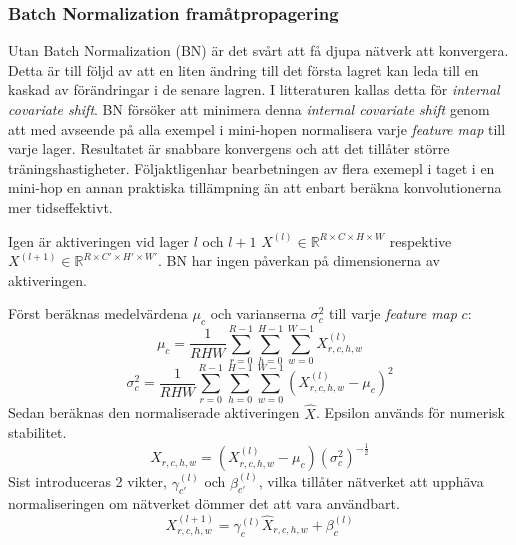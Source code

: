 \documentclass[a4paper,11pt,twoside]{article}
\begin{document}
\subsubsection{Batch Normalization framåtpropagering}
Utan Batch Normalization (BN) är det svårt att få djupa nätverk att konvergera. Detta är till följd av att en liten ändring till det första lagret kan leda till en kaskad av förändringar i de senare lagren. I litteraturen kallas detta för \textit{internal covariate shift}. BN försöker att minimera denna \textit{internal covariate shift} genom att med avseende på alla exempel i mini-hopen normalisera varje \textit{feature map} till varje lager. Resultatet är snabbare konvergens och att det tillåter större träningshastigheter. Följaktligenhar bearbetningen av flera exemepl i taget i en mini-hop en annan praktiska tillämpning än att enbart beräkna konvolutionerna mer tidseffektivt. \cite{cs231n} \cite{batchnorm}

Igen är aktiveringen vid lager $l$ och $l+1$ $X^{(l)} \in \mathbb{R}^{R \times C \times H \times W}$ respektive $X^{(l+1)} \in \mathbb{R}^{R \times C' \times H' \times W'}$. BN har ingen påverkan på dimensionerna av aktiveringen. \cite{cs231n} \cite{batchnorm}

Först beräknas medelvärdena $\mu_c$ och varianserna $\sigma^2_c$ till varje \textit{feature map} $c$: \cite{cs231n} \cite{batchnorm}
\begin{equation}
\mu_c = \frac{1}{RHW} \sum^{R-1}_{r=0} \sum^{H-1}_{h=0} \sum^{W-1}_{w=0} X^{(l)}_{r,c,h,w}
\end{equation}
\begin{equation}
\sigma^2_c  = \frac{1}{RHW} \sum^{R-1}_{r=0} \sum^{H-1}_{h=0} \sum^{W-1}_{w=0} ({X^{(l)}_{r,c,h,w} - \mu_c})^2
\end{equation}
Sedan beräknas den normaliserade aktiveringen $\hat{X}$. Epsilon används för numerisk stabilitet. \cite{cs231n} \cite{batchnorm}
\begin{equation}
\hat{X}_{r,c,h,w} = (X^{(l)}_{r,c,h,w} - \mu_c){(\sigma^2_c)}^{-\frac{1}{2}}
\end{equation}
Sist introduceras 2 vikter, $\gamma_{c'}^{(l)}$ och $\beta_{c'}^{(l)}$, vilka tillåter nätverket att upphäva normaliseringen om nätverket dömmer det att vara användbart. \cite{cs231n} \cite{batchnorm}
\begin{equation}
X^{(l+1)}_{r,c,h,w} = \gamma_{c}^{(l)} \hat{X}_{r,c,h,w} + \beta_{c}^{(l)}
\end{equation}
\end{document}
